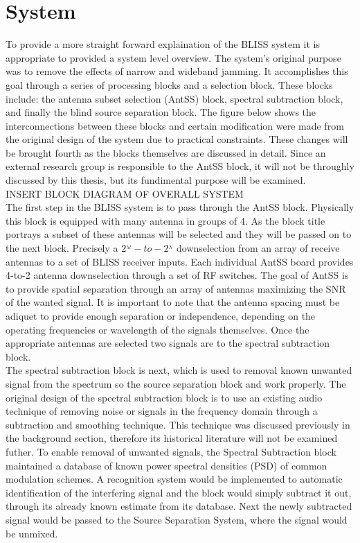 \section{System}

To provide a more straight forward explaination of the BLISS system it is appropriate to provided a system level overview.  The system's original purpose was to remove the effects of narrow and wideband jamming.  It accomplishes this goal through a series of processing blocks and a selection block.  These blocks include: the antenna subset selection (AntSS) block, spectral subtraction block, and finally the blind source separation block.  The figure below shows the interconnections between these blocks and certain modification were made from the original design of the system due to practical constraints.  These changes will be brought fourth as the blocks themselves are discussed in detail. Since an external research group is responsible to the AntSS block, it will not be throughly discussed by this thesis, but its fundimental purpose will be examined.\\

INSERT BLOCK DIAGRAM OF OVERALL SYSTEM\\

The first step in the BLISS system is to pass through the AntSS block.  Physically this block is equipped with many antenna in groups of 4.  As the block title portrays a subset of these antennas will be selected and they will be passed on to the next block.  Precisely a \(2^_{M}-to-2^_{N}\) downselection from an array of receive antennas to a set of BLISS receiver inputs. Each individual AntSS board provides 4-to-2 antenna downselection through a set of RF switches.  The goal of AntSS is to provide spatial separation through an array of antennas maximizing the SNR of the wanted signal.  It is important to note that the antenna spacing must be adiquet to provide enough separation or independence, depending on the operating frequencies or wavelength of the signals themselves.  Once the appropriate antennas are selected two signals are to the spectral subtraction block.\\

The spectral subtraction block is next, which is used to removal known unwanted signal from the spectrum so the source separation block and work properly.  The original design of the spectral subtraction block is to use an existing audio technique of removing noise or signals in the frequency domain through a subtraction and smoothing technique.  This technique was discussed previously in the background section, therefore its historical literature will not be examined futher.  To enable removal of unwanted signals, the Spectral Subtraction block maintained a database of known power spectral densities (PSD) of common modulation schemes.  A recognition system would be implemented to automatic identification of the interfering signal and the block would simply subtract it out, through its already known estimate from its database.  Next the newly subtracted signal would be passed to the Source Separation System, where the signal would be unmixed.\\


